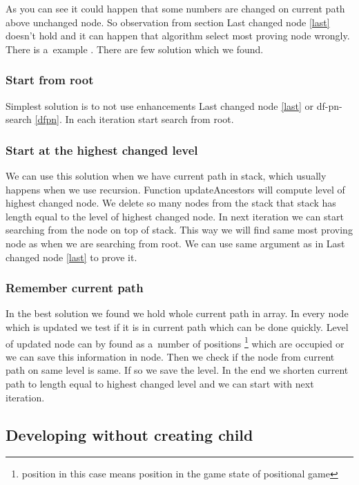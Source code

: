 As you can see  it could happen that some numbers are changed on
current path above unchanged node. So observation from section Last changed
node \ref{last} doesn't hold and it can happen that algorithm select most
proving node wrongly. There is a~example . There are few solution which
we found.

\subsubsection{Start from root}

Simplest solution is to not use enhancements Last changed node \ref{last}
or df-pn-search \ref{dfpn}. In each iteration start search from root.

\subsubsection{Start at the highest changed level}

We can use this solution when we have current path in stack, which usually
happens when we use recursion. Function updateAncestors will compute level of
highest changed node. We delete so many nodes from the stack that stack has
length equal to the level of highest changed node. In next iteration we can
start searching from the node on  top of stack. This way
we will find same most proving node as when we are searching from root. We can
use same argument as in Last changed node \ref{last} to prove it.

\subsubsection{Remember current path}

In the best solution we found we hold whole current path in array. In every
node which is updated we test if it is in current path which can be done
quickly.  Level of updated node can by found as a~number of positions
\footnote{ position in this case means position in the game state of positional
game} which are occupied or we can save this information in node. Then we
check if the node from current path on same level is same. If so we save the
level. In the end we shorten current path to length equal to highest changed
level and we can start with next iteration.

\subsection{Developing without creating child}

